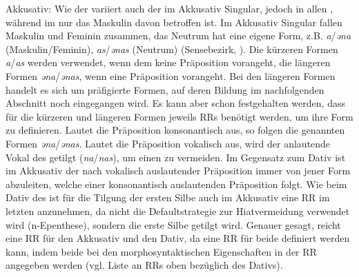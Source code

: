 {Akkusativ}: Wie der  variiert auch der  im Akkusativ Singular, jedoch in allen , während im  nur das Maskulin davon betroffen ist. Im Akkusativ Singular fallen Maskulin und Feminin zusammen, das Neutrum hat eine eigene Form, z.B. \textit{a}/\textit{əna} (Maskulin/Feminin), \textit{as}/\textit{ənas} (Neutrum) (Sensebezirk, \citealt[194]{Henzen1927}). Die kürzeren Formen \textit{a}/\textit{as} werden verwendet, wenn dem  keine Präposition vorangeht, die längeren Formen \textit{əna}/\textit{ənas}, wenn eine Präposition vorangeht. Bei den längeren Formen handelt es sich um präfigierte Formen, auf deren Bildung im nachfolgenden Abschnitt  noch eingegangen wird. Es kann aber schon festgehalten werden, dass für die kürzeren und längeren Formen jeweils RRs benötigt werden, um ihre Form zu definieren. Lautet die Präposition konsonantisch aus, so folgen die genannten Formen \textit{əna}/\textit{ənas}. Lautet die Präposition vokalisch aus, wird der anlautende Vokal des  getilgt (\textit{na}/\textit{nas}), um einen  zu vermeiden. Im Gegensatz zum Dativ ist im Akkusativ der  nach vokalisch auslautender Präposition immer von jener Form abzuleiten, welche einer konsonantisch auslautenden Präposition folgt. Wie beim Dativ des  ist für die Tilgung der ersten Silbe auch im Akkusativ eine RR im letzten  anzunehmen, da nicht die Defaultstrategie zur Hiatvermeidung verwendet wird (n-Epenthese), sondern die erste Silbe getilgt wird. Genauer gesagt, reicht eine RR für den Akkusativ und den Dativ, da eine RR für beide  definiert werden kann, indem beide  bei den morphosyntaktischen Eigenschaften in der RR angegeben werden (vgl. Liste an RRs oben bezüglich des Dativs).

